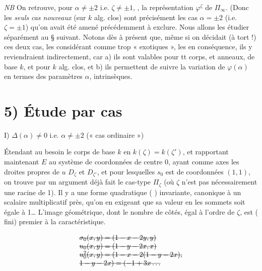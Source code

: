 \documentclass[11pt,a4paper]{article}
\begin{document}
\emph{NB} On retrouve, pour $\alpha \neq \pm 2$ i.e. $\zeta \neq \pm 1$, , la représentation $\varphi^{\zeta}$ de $\Pi_\infty$. (Donc les \emph{seuls} \emph{cas nouveaux} (sur $k$ alg. clos) sont précisément les cas $\alpha = \pm 2$ (i.e. $\zeta = \pm 1$) qu'on avait été amené précédemment à exclure. Nous allons les étudier séparément au § suivant. Notons dès à présent que, même si on décidait (à tort !) \ill{} \ill{} \ill{} ces deux cas, les considérant comme trop « exotiques », les  en conséquence, ils y reviendraient indirectement, car a) ils sont valables pour tt corps, et \ill{}  anneaux, de base $k$, et   pour $k$ alg. clos, et b) ils permettent de suivre la variation de \struck{\ill{}} $\varphi(\alpha)$ en termes des paramètres $\alpha$, intrinsèques.

\section*{5) Étude par cas}

I) $\Delta(\alpha) \neq 0$ i.e. $\alpha \neq \pm 2$ (« cas ordinaire »)

Étendant au besoin le corps de base $k$ en $k(\zeta) = k(\zeta')$, et rapportant maintenant $E$ au système de coordonnées de centre $0$, ayant comme axes les droites propres de $u$ $D_\zeta$ et $D_{\zeta'}$, et pour lesquelles $s_0$ est de coordonnées $(1,1)$, on trouve par un argument déjà fait le cas-type $\Pi_\zeta$ (où $\zeta$ n'est pas nécessairement une racine de 1). Il y a une forme quadratique ( \ill{}) invariante, canonique à un scalaire multiplicatif près, qu'on  en exigeant que sa valeur en les sommets  soit égale à 1… L'image \struck{$\Pi_\zeta$}  géométrique, dont le nombre de côtés, égal à l'ordre de $\zeta$, est (  fini) premier à la caractéristique.

\[
\begin{array}{l}
\text{\struck{$\sigma_0(x,y) = (1 - x - 2y, y)$}} \\
\text{\struck{$u_0(x,y) = (1 - y - 2x, x)$}} \\
\text{\struck{$u_0^2(x,y) = (1 - x - 2(1 - y - 2x),$}} \\
\text{\struck{$1 - y - 2x) = (-1 + 3x \ldots$}}
\end{array}
\]
\end{document}
